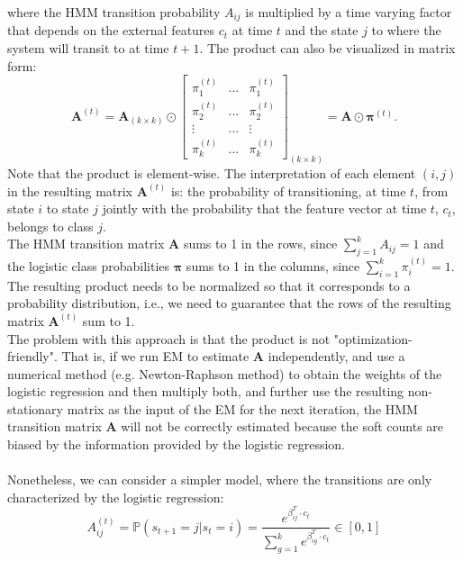 \documentclass{article}
\begin{document}
where the HMM transition probability $A_{ij}$ is multiplied by a time varying factor that depends on the external features $c_t$ at time $t$ and the state $j$ to where the system will transit to at time $t+1$. The product can also be visualized in matrix form:
\begin{equation}
   \boldsymbol{A}^{(t)} = \boldsymbol{A}_{(k\times k)} \odot \begin{bmatrix}
    \pi_{1}^{(t)} & ... & \pi_{1}^{(t)}\\
    \pi_{2}^{(t)} & ... & \pi_{2}^{(t)}\\
    \vdots & ... & \vdots\\
    \pi_{k}^{(t)} &  ... & \pi_{k}^{(t)}\end{bmatrix}_{(k \times k)} = \boldsymbol{A} \odot \boldsymbol{\pi}^{(t)}.
\end{equation}
Note that the product is element-wise. The interpretation of each element $(i,j)$ in the resulting matrix $\boldsymbol{A}^{(t)}$ is: the probability of transitioning, at time $t$, from state $i$ to state $j$ jointly with the probability that the feature vector at time $t$, $c_t$, belongs to class $j$. \\ \noindent
The HMM transition matrix $\boldsymbol{A}$ sums to 1 in the rows, since $\sum_{j=1}^k A_{ij}=1$ and the logistic class probabilities $\boldsymbol{\pi}$ sums to 1 in the columns, since $\sum_{i=1}^k \pi_i^{(t)} = 1$. The resulting product needs to be normalized so that it corresponds to a probability distribution, i.e., we need to guarantee that the rows of the resulting matrix $\boldsymbol{A}^{(t)}$ sum to 1. \\ \noindent
The problem with this approach is that the product is not "optimization-friendly". That is, if we run EM to estimate $\boldsymbol{A}$ independently, and use a numerical method (e.g. Newton-Raphson method) to obtain the weights of the logistic regression and then multiply both, and further use the resulting non-stationary matrix as the input of the EM for the next iteration, the HMM transition matrix $\boldsymbol{A}$ will not be correctly estimated because the soft counts are biased by the information provided by the logistic regression.
\\ \\ \noindent 
Nonetheless, we can consider a simpler model, where the transitions are only characterized by the logistic regression:
\begin{equation}
    A_{ij}^{(t)} = \mathbb{P}(s_{t+1}=j|s_{t}=i) = \dfrac{e^{\beta_{ij}^T \cdot c_t}}{\sum_{g=1}^k  e^{\beta_{ig}^T\cdot c_t}} \in [0,1]
    \label{A_ijt}
\end{equation}
\end{document}
